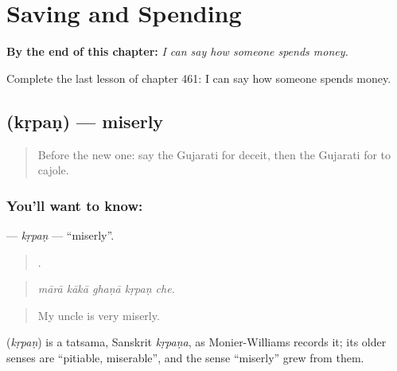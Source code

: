 
\chapter{Saving and Spending}
\label{ch:gu-saving-and-spending}

\begin{chapteropening}
\textbf{By the end of this chapter:} \emph{I can say how someone spends money.}

Complete the last lesson of chapter 461: I can say how someone spends money.
\end{chapteropening}

\section[\texorpdfstring{\gu{કૃપણ} (kṛpaṇ)}{કૃપણ (kṛpaṇ)}]{ (kṛpaṇ) — miserly}

\label{lesson:GU-C461-krpan}



\begin{quote}
Before the new one: say the Gujarati for deceit, then the Gujarati for to cajole.
\end{quote}

\subsection*{You'll want to know: }
\textbf{} — \emph{kṛpaṇ} — \textquotedblleft{}miserly\textquotedblright{}.

\begin{quote}
    .
\end{quote}

\begin{quote}
\emph{mārā kākā ghaṇā kṛpaṇ che.}
\end{quote}

\begin{quote}
My uncle is very miserly.
\end{quote}

\begin{cousinweb}
\textbf{} (\emph{kṛpaṇ}) is a tatsama, Sanskrit \emph{kṛpaṇa}, as Monier-Williams records it; its older senses are \textquotedblleft{}pitiable, miserable\textquotedblright{}, and the sense \textquotedblleft{}miserly\textquotedblright{} grew from them.
\end{cousinweb}

